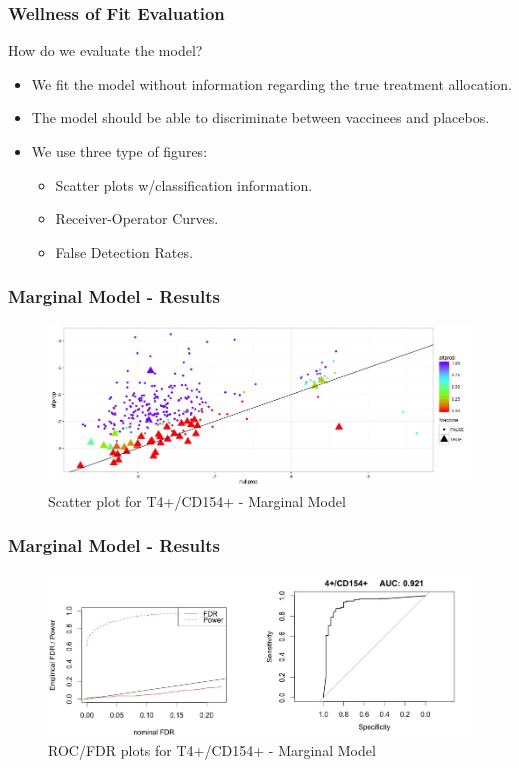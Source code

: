 \documentclass{beamer}
\theoremstyle{definition}
\begin{document}

\begin{frame}
\frametitle{Wellness of Fit Evaluation}
How do we evaluate the model?
\begin{itemize}
\item We fit the model without information regarding the true treatment allocation. 
\vspace{0.3 cm}
\item The model should be able to discriminate between vaccinees and placebos.
\vspace{0.3 cm}
\pause
\item We use three type of figures:
	\begin{itemize}
	\item Scatter plots w/classification information.
	\item Receiver-Operator Curves.
	\item False Detection Rates. 
	\end{itemize}
\end{itemize}
\end{frame}


\begin{frame}
\frametitle{Marginal Model - Results}
\begin{center}
\begin{figure}[]
\includegraphics[width=12 cm]{figures/T4cd154scatter} \caption{Scatter plot for T4+/CD154+ - Marginal Model}
\end{figure}
\end{center}
\end{frame}


\begin{frame}
\frametitle{Marginal Model - Results}
\begin{figure}[]
\includegraphics[width=12 cm]{figures/T4cd154roc} \caption{ROC/FDR plots for T4+/CD154+ - Marginal Model}
\end{figure}
\end{frame}
\end{document}
